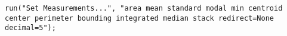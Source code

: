\begin{lstlisting}[numbers=none]
run("Set Measurements...", "area mean standard modal min centroid center perimeter bounding integrated median stack redirect=None decimal=5");

\end{lstlisting}